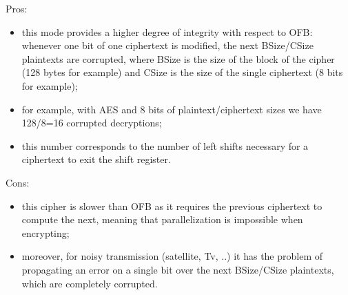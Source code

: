 \documentclass[a4paper, 12pt]{report}
\begin{document}
Pros:
\begin{itemize}
	\item this mode provides a higher degree of integrity with respect to OFB: whenever one bit of one ciphertext is modified, the next BSize/CSize plaintexts are corrupted, where BSize is the size of the block of the cipher (128 bytes for example) and CSize is the size of the single ciphertext (8 bits for example);
	\item for example, with AES and 8 bits of plaintext/ciphertext sizes we have 128/8=16 corrupted decryptions;
	\item this number corresponds to the number of left shifts necessary for a ciphertext to exit the shift register.
\end{itemize}

Cons:
\begin{itemize}
	\item this cipher is slower than OFB as it requires the previous ciphertext to compute the next, meaning that parallelization is impossible when encrypting;
	\item moreover, for noisy transmission (satellite, Tv, ..) it has the problem of propagating an error on a single bit over the next BSize/CSize plaintexts, which are completely corrupted.
\end{itemize}
\end{document}
